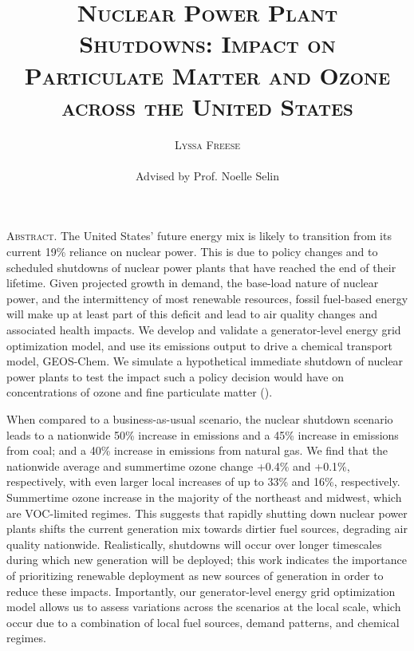 \documentclass[12]{article}
\title{{\textsc{\Large Nuclear Power Plant Shutdowns: Impact on Particulate Matter and Ozone across the United States}}}
\author{\textsc{Lyssa Freese}
\\\\
Advised by Prof. Noelle Selin}
\begin{document}
\maketitle
\thispagestyle{empty}

\setlength{\leftskip}{1.1cm}
\setlength{\rightskip}{1.1cm}


\bigskip
\bigskip

{\textsc{Abstract.} 
The United States’ future energy mix is likely to transition from its current 19\% reliance on nuclear power. This is due to policy changes and to scheduled shutdowns of nuclear power plants that have reached the end of their lifetime. Given projected growth in demand, the base-load nature of nuclear power, and the intermittency of most renewable resources, fossil fuel-based energy will make up at least part of this deficit and lead to air quality changes and associated health impacts. We develop and validate a generator-level energy grid optimization model, and use its emissions output to drive a chemical transport model, GEOS-Chem. We simulate a hypothetical immediate shutdown of nuclear power plants to test the impact such a policy decision would have on concentrations of ozone and fine particulate matter ().

When compared to a business-as-usual scenario, the nuclear shutdown scenario leads to a nationwide 50\% increase in  emissions and a 45\% increase in  emissions from coal; and a 40\% increase in  emissions from natural gas. We find that the nationwide average  and summertime ozone change +0.4\% and +0.1\%, respectively, with even larger local increases of up to 33\% and 16\%, respectively. Summertime ozone increase in the majority of the northeast and midwest, which are VOC-limited regimes. This suggests that rapidly shutting down nuclear power plants shifts the current generation mix towards dirtier fuel sources, degrading air quality nationwide. Realistically, shutdowns will occur over longer timescales during which new generation will be deployed; this work indicates the importance of prioritizing renewable deployment as new sources of generation in order to reduce these impacts. Importantly, our generator-level energy grid optimization model allows us to assess variations across the scenarios at the local scale, which occur due to a combination of local fuel sources, demand patterns, and chemical regimes.}

\bigskip
\bigskip 
\clearpage
\setcounter{page}{1}

\setlength{\leftskip}{0cm}
\setlength{\rightskip}{0cm}
\end{document}

